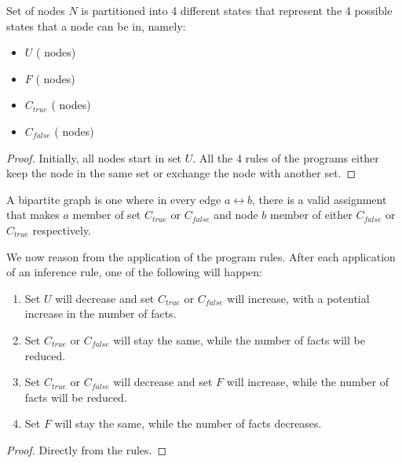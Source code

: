 \begin{invariant}
Set of nodes $N$ is partitioned into 4 different states that represent the 4
possible states that a node can be in, namely:

\begin{itemize}
   \item $U$ ( nodes)
   \item $F$ ( nodes)
   \item $C_{true}$ ( nodes)
   \item $C_{false}$ ( nodes)
\end{itemize}
\end{invariant}
\begin{proof}
Initially, all nodes start in set $U$. All the 4 rules of the programs either
keep the node in the same set or exchange the node with another set.
\end{proof}

A bipartite graph is one where in every edge $a \leftrightarrow b$, there is a
valid assignment that makes $a$ member of set $C_{true}$ or $C_{false}$ and node
$b$ member of either $C_{false}$ or $C_{true}$ respectively.

\begin{variant}\label{language:lemma:bipartite_convergence}
   We now reason from the application of the program rules. After each
   application of an inference rule, one of the following will happen:

   \begin{enumerate}
      \item Set $U$ will decrease and set $C_{true}$ or $C_{false}$ will
         increase, with a potential increase in the number of 
         facts.
      \item Set $C_{true}$ or $C_{false}$ will stay the same, while the number
         of  facts will be reduced.

      \item Set $C_{true}$ or $C_{false}$ will decrease and set $F$ will
         increase, while the number of  facts will be reduced.

      \item Set $F$ will stay the same, while the number of  facts
         decreases.
   \end{enumerate}

\end{variant}
\begin{proof}
Directly from the rules.
\end{proof}

